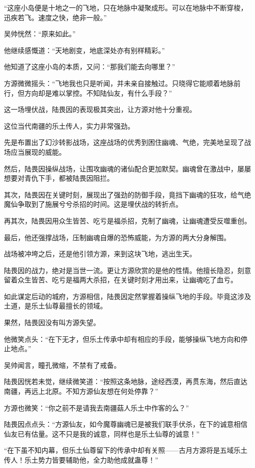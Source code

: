 \begin{this_body}
“这座小岛便是十地之一的飞地，只在地脉中凝聚成形。可以在地脉中不断穿梭，迅疾若飞。速度之快，绝非一般。”

吴帅恍然：“原来如此。”

他继续感慨道：“天地剧变，地底深处亦有别样精彩。”

他知道了这座小岛的本质，又问：“那我们能去向哪里？”

方源微微摇头：“飞地我也只是听闻，并未亲自接触过。只晓得它能顺着地脉前行，但方向却是难以掌控。不知陆仙友，有什么手段？”

这一场埋伏战，陆畏因的表现极其突出，让方源对他十分重视。

这位当代南疆的乐土传人，实力非常强劲。

先是布置出了幻沙转影战场，这座战场的优秀到困住幽魂、气绝，完美地呈现了战场应当展现的威能。

然后，陆畏因操纵战场，让围攻幽魂的诸仙配合更加默契。幽魂曾在激战中，屡屡想要对青仇下手，都被陆畏因阻拦。

其次，陆畏因在关键时刻，展现出了强劲的防御手段，竟挡下幽魂的狂攻，给气绝魔仙争取到了施展兮兮杀招的时间。这是埋伏战的转折点。

再其次，陆畏因用众生皆苦、吃亏是福杀招，克制了幽魂，让幽魂遭受反噬重创。

最后，他还强撑战场，压制幽魂自爆的恐怖威能，为方源的两大分身解围。

战场被冲垮之后，还是他引领方源，来到这块飞地，逃出生天。

陆畏因的战力，绝对是当世一流。更让方源欣赏的是他的性情。他擅长隐忍，刻意留着众生皆苦、吃亏是福两大杀招，在关键时刻才用出来，让幽魂吃了血亏。

如此谋定后动的城府，方源相信，陆畏因定然掌握着操纵飞地的手段。毕竟这涉及土道，是乐土仙尊最擅长的领域。

果然，陆畏因没有叫方源失望。

他微笑点头：“在下无才，但乐土传承中却有相应的手段，能够操纵飞地方向和停止地点。”

吴帅闻言，瞳孔微缩，不禁有了戒备。

陆畏因恍若未觉，继续微笑道：“按照这条地脉，途经西漠，再贯东海，然后直达南疆，再远上北原。不知方源仙友想在何处停靠？”

方源也微笑：“你之前不是请我去南疆菇人乐土中作客的么？”

陆畏因点点头：“方源仙友，如今魔尊幽魂已是被我们联手伏杀，在下的诚意相信仙友已有估量。这不只是我的诚意，同样也是乐土仙尊的诚意！”

“在下虽不知内幕，但乐土仙尊留下的传承中却有关照——古月方源将是五域乐土传人！乐土势力皆要辅助他，全力助他成就蛊尊！”

\end{this_body}

